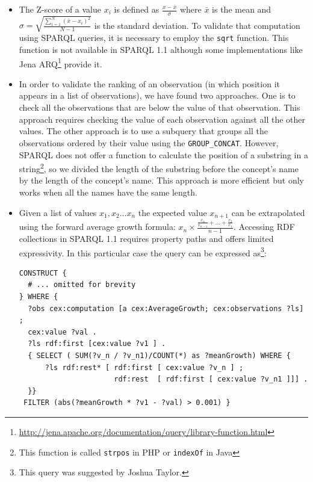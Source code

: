 \documentclass{llncs}
\newcommand{\footnoteUrl}[1]{\footnote{\url{#1}}}
\begin{document}
\begin{itemize} 

\item The Z-score of a value $x_i$ is defined as $\frac{x - \bar{x}}{\sigma}$
where $\bar{x}$ is the mean and $\sigma=\sqrt{\frac{\sum_{i=1}^{N}(\bar{x}-x_i)^2}{N -
1}}$ is the standard deviation. To validate that computation using SPARQL
queries, it is necessary to employ the \lstinline|sqrt| function. 
This function is not available in SPARQL 1.1 although some implementations 
 like Jena
 ARQ\footnoteUrl{http://jena.apache.org/documentation/query/library-function.html} 
 provide it.

\item In order to validate the ranking of an observation (in which position it
appears in a list of observations), we have found two approaches. One is to
check all the observations that are below the value of that observation. 
This approach requires checking the value of each observation against all the
other values. The other approach is to use a subquery that groups all the
observations ordered by their value using the \lstinline|GROUP_CONCAT|. 
However, SPARQL does not offer a function to calculate the position
of a substring in a string\footnote{This function is called \lstinline|strpos| in PHP or \lstinline|indexOf| in Java}, 
so we divided the length of the substring before the concept's 
name by the length of the concept's name. 
This approach is more efficient but only works when all the names have
the same length.

\item Given a list of values $x_1,x_2\ldots{}x_n$ the expected value
$x_{n+1}$ can be extrapolated using the forward average growth formula: 
$x_n\times{\frac{\frac{x_{n}}{x_{n-1}}+\ldots{}+\frac{x_{2}}{x_1}}{n-1}}$. 
Accessing RDF collections in SPARQL 1.1 requires property paths 
and offers limited expressivity. In this particular case 
the query can be expressed 
as\footnote{This query was suggested by Joshua Taylor.}:

\begin{lstlisting}[style=SPARQL]
CONSTRUCT {
  # ... omitted for brevity
} WHERE { 
  ?obs cex:computation [a cex:AverageGrowth; cex:observations ?ls] ;
  cex:value ?val .
  ?ls rdf:first [cex:value ?v1 ] .
  { SELECT ( SUM(?v_n / ?v_n1)/COUNT(*) as ?meanGrowth) WHERE {
      ?ls rdf:rest* [ rdf:first [ cex:value ?v_n ] ; 
                      rdf:rest  [ rdf:first [ cex:value ?v_n1 ]]] .
  }} 
 FILTER (abs(?meanGrowth * ?v1 - ?val) > 0.001) }
\end{lstlisting}

\end{itemize}
\end{document}
